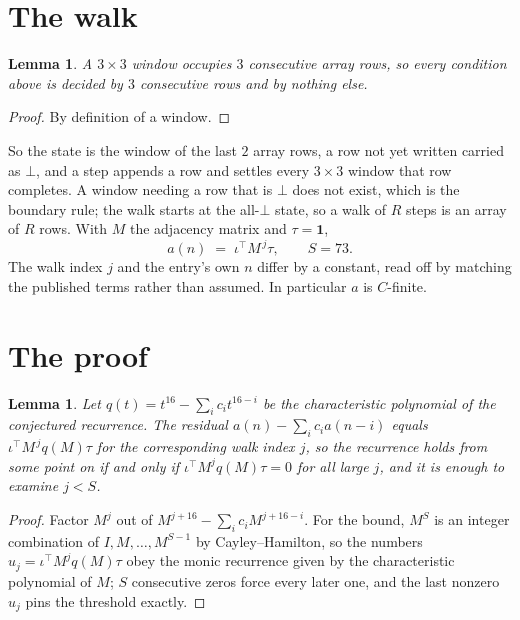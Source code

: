 \documentclass[11pt,a4paper]{article}
\theoremstyle{plain}
\newtheorem{lemma}[theorem]{Lemma}
\theoremstyle{definition}
\begin{document}
\section{The walk}

\begin{lemma}\label{lem:win}
A $3\times3$ window occupies $3$ consecutive array rows, so every condition above is
decided by $3$ consecutive rows and by nothing else.
\end{lemma}

\begin{proof}
By definition of a window.
\end{proof}

So the state is the window of the last $2$ array rows, a row not yet written carried as
$\bot$, and a step appends a row and settles every $3\times3$ window that row completes. A
window needing a row that is $\bot$ does not exist, which is the boundary rule; the walk starts
at the all-$\bot$ state, so a walk of $R$ steps is an array of $R$ rows. With $M$ the adjacency
matrix and $\tau=\mathbf{1}$,
\[
a(n)\;=\;\iota^{\!\top}M^{\,j}\tau ,\qquad S=73.
\]
The walk index $j$ and the entry's own $n$ differ by a constant, read off by matching the
published terms rather than assumed. In particular $a$ is $C$-finite.

\section{The proof}

\begin{lemma}\label{lem:crit}
Let $q(t)=t^{16}-\sum_i c_it^{16-i}$ be the characteristic polynomial of the
conjectured recurrence. The residual $a(n)-\sum_ic_ia(n-i)$ equals
$\iota^{\!\top}M^{\,j}q(M)\tau$ for the corresponding walk index $j$, so the recurrence
holds from some point on if and only if $\iota^{\!\top}M^{j}q(M)\tau=0$ for all large $j$,
and it is enough to examine $j<S$.
\end{lemma}

\begin{proof}
Factor $M^{j}$ out of $M^{j+16}-\sum_ic_iM^{j+16-i}$. For the bound, $M^{S}$
is an integer combination of $I,M,\dots,M^{S-1}$ by Cayley--Hamilton, so the numbers
$u_j=\iota^{\!\top}M^{j}q(M)\tau$ obey the monic recurrence given by the characteristic
polynomial of $M$; $S$ consecutive zeros force every later one, and the last nonzero $u_j$
pins the threshold exactly.
\end{proof}
\end{document}
